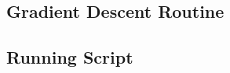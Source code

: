 \documentclass[11pt,a4paper]{article}
\begin{document}
\subsection{Gradient Descent Routine}

\newpage

\subsection{Running Script}


\end{document}
